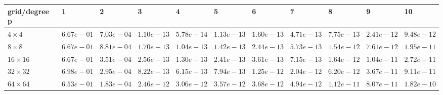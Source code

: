 \begin{tabular}{lllllllllll}
\hline
 grid/degree p   & 1          & 2          & 3          & 4          & 5          & 6          & 7          & 8          & 9          & 10         \\
\hline
 $4 \times 4$    & $6.67e-01$ & $7.03e-04$ & $1.10e-13$ & $5.78e-14$ & $1.13e-13$ & $1.60e-13$ & $4.71e-13$ & $7.75e-13$ & $2.41e-12$ & $9.48e-12$ \\
 $8 \times 8$    & $6.67e-01$ & $8.81e-04$ & $1.70e-13$ & $1.04e-13$ & $1.42e-13$ & $2.44e-13$ & $5.73e-13$ & $1.54e-12$ & $7.61e-12$ & $1.95e-11$ \\
 $16 \times 16$  & $6.67e-01$ & $3.51e-04$ & $2.56e-13$ & $1.30e-13$ & $2.41e-13$ & $3.61e-13$ & $7.15e-13$ & $1.64e-12$ & $1.04e-11$ & $2.72e-11$ \\
 $32 \times 32$  & $6.98e-01$ & $2.95e-04$ & $8.22e-13$ & $6.15e-13$ & $7.94e-13$ & $1.25e-12$ & $2.04e-12$ & $6.20e-12$ & $3.67e-11$ & $9.11e-11$ \\
 $64 \times 64$  & $6.53e-01$ & $1.83e-04$ & $2.46e-12$ & $3.06e-12$ & $3.57e-12$ & $3.68e-12$ & $4.94e-12$ & $1.12e-11$ & $8.07e-11$ & $1.82e-10$ \\
\hline
\end{tabular}